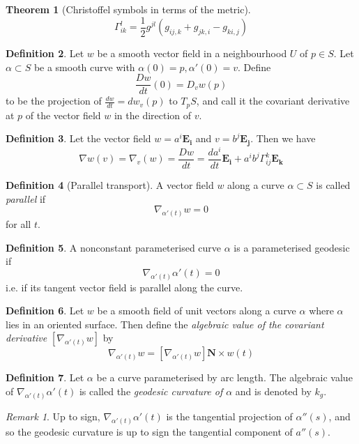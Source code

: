 \documentclass[10pt, oneside, reqno]{amsart}
\newcommand{\christ}[3]{\ensuremath{\Gamma^{#1}_{#2#3}}}
\theoremstyle{plain}%
\newtheorem{thm}{Theorem}[section]
\theoremstyle{definition}
\newtheorem{defn}[thm]{Definition}
\theoremstyle{remark}
\newtheorem*{rem}{Remark}
\begin{document}
\begin{thm}[Christoffel symbols in terms of the metric]
	\[
		\christ{l}{i}{k} = \frac{1}{2}g^{jl}\left( g_{ij,k} + g_{jk,i} - g_{ki,j} \right)
	\]
\end{thm}

\begin{defn}
	Let $w$ be a smooth vector field in a neighbourhood $U$ of $p \in S$.  Let $\alpha \subset S$ be a smooth curve with $\alpha(0) = p, \alpha'(0) = v$.  Define \[
		\frac{Dw}{dt}(0) = D_v w(p)
	\]
	to be the projection of $\frac{dw}{dt} = dw_v(p)$ to $T_p S$, and call it the covariant derivative at $p$ of the vector field $w$ in the direction of $v$.
\end{defn}


\begin{defn}
	Let the vector field $w = a^i \mathbf{E_i}$ and $v = b^j \mathbf{E_j}$.  Then we have \[
		\nabla w (v) = \nabla_v(w) = \frac{Dw}{dt} = \frac{da^i}{dt}\mathbf{E_i} + a^i b^j \christ{k}{i}{j} \mathbf{E_k}
	\]
\end{defn}

\begin{defn}[Parallel transport]
	A vector field $w$ along a curve $\alpha \subset S$ is called \emph{parallel} if \[
		\nabla_{\alpha'(t)}w = 0
	\]
	for all $t$.
\end{defn}

\begin{defn}
	A nonconstant parameterised curve $\alpha$ is a parameterised geodesic if \[
	\nabla_{\alpha'(t)} \alpha'(t) = 0	
	\]
	i.e. if its tangent vector field is parallel along the curve.
\end{defn}

\begin{defn}
	Let $w$ be a smooth field of unit vectors along a curve $\alpha$ where $\alpha$ lies in an oriented surface.  Then define the \emph{algebraic value of the covariant derivative} $[	\nabla_{\alpha'(t)}w]$ by \[
			\nabla_{\alpha'(t)}w = [	\nabla_{\alpha'(t)}w] \mathbf{N} \times w(t)
	\]
\end{defn}

\begin{defn}
		Let $\alpha$ be a curve parameterised by arc length.  The algebraic value of  $	\nabla_{\alpha'(t)} \alpha'(t)$ is called the \emph{geodesic curvature of $\alpha$} and is denoted by $k_g$.
\end{defn}

\begin{rem}
	Up to sign, $	\nabla_{\alpha'(t)} \alpha'(t)$ is the tangential projection of $\alpha''(s)$, and so the geodesic curvature is up to sign the tangential component of $a''(s)$.
\end{rem}
\end{document}
